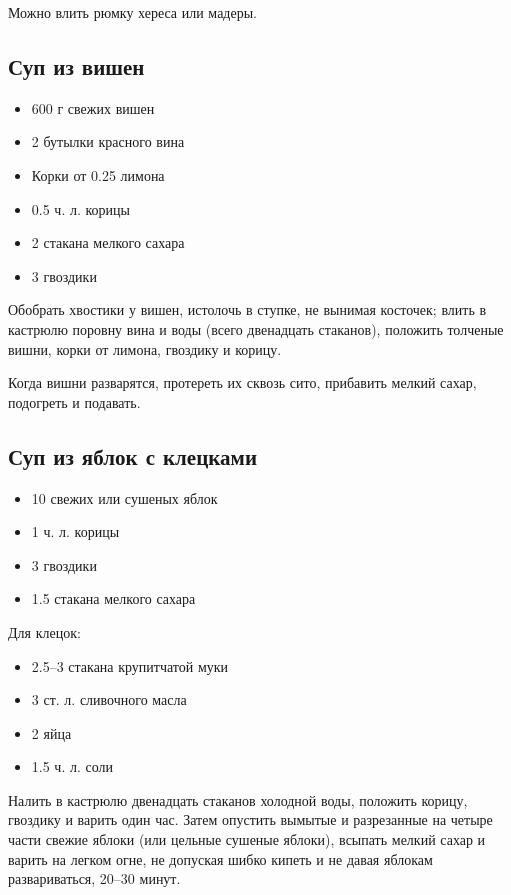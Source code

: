 Можно влить рюмку хереса или мадеры.

\subsection{Суп из вишен}\label{22sup-vishni}

\begin{itemize}
	\item 600 г свежих вишен 
    \item 2 бутылки красного вина
    \item Корки от 0.25 лимона
    \item 0.5 ч. л. корицы
    \item 2 стакана мелкого сахара
    \item 3 гвоздики
\end{itemize}

Обобрать хвостики у вишен, истолочь в ступке, не вынимая косточек; влить в кастрюлю поровну вина и воды (всего двенадцать стаканов), положить толченые вишни, корки от лимона, гвоздику и корицу.

Когда вишни разварятся, протереть их сквозь сито, прибавить мелкий сахар, подогреть и подавать.

\subsection{Суп из яблок с клецками}\label{23sup-jabloki}

\begin{itemize}
	\item 10 свежих или сушеных яблок
    \item 1 ч. л. корицы
    \item 3 гвоздики 
    \item 1.5 стакана мелкого сахара
\end{itemize}

Для клецок: 

\begin{itemize}
	\item 2.5–3 стакана крупитчатой муки
    \item 3 ст. л. сливочного масла 
    \item 2 яйца
    \item 1.5 ч. л. соли
\end{itemize}

Налить в кастрюлю двенадцать стаканов холодной воды, положить корицу, гвоздику и варить один час. Затем опустить вымытые и разрезанные на четыре части свежие яблоки (или цельные сушеные яблоки), всыпать мелкий сахар и варить на легком огне, не допуская шибко кипеть и не давая яблокам развариваться, 20–30 минут.

